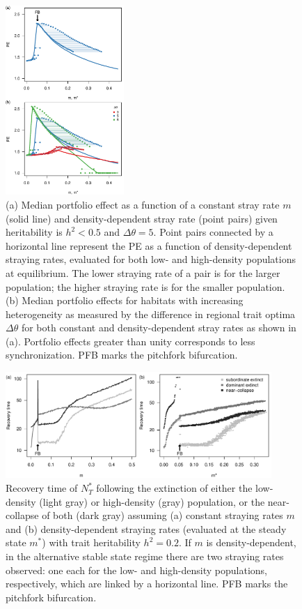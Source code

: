 \documentclass{revtex4}
\begin{document}
\begin{figure}
  \captionsetup{justification=raggedright,
singlelinecheck=false
}
\centering
\includegraphics[width=0.4\textwidth]{fig_thetaPEmvm.pdf}
\caption{
(a) Median portfolio effect as a function of a constant stray rate $m$ (solid line) and density-dependent stray rate (point pairs) given heritability is $h^2 < 0.5$ and $\Delta\theta=5$.
Point pairs connected by a horizontal line represent the PE as a function of density-dependent straying rates, evaluated for both low- and high-density populations at equilibrium. The lower straying rate of a pair is for the larger population; the higher straying rate is for the smaller population.
(b) Median portfolio effects for habitats with increasing heterogeneity as measured by the difference in regional trait optima $\Delta \theta$ for both constant and density-dependent stray rates as shown in (a).
Portfolio effects greater than unity corresponds to less synchronization.
PFB marks the pitchfork bifurcation.
} \label{fig:thetaPE}
\end{figure}

\begin{figure}
  \captionsetup{justification=raggedright,
singlelinecheck=false
}
\centering
\includegraphics[width=0.9\textwidth]{fig_relax_lowh.pdf}
\caption{
Recovery time of $N_T^*$ following the extinction of either the low-density (light gray) or high-density (gray) population, or the near-collapse of both (dark gray) assuming (a) constant straying rates $m$ and (b) density-dependent straying rates (evaluated at the steady state $m^*$) with trait heritability $h^2=0.2$.
If $m$ is density-dependent, in the alternative stable state regime there are two straying rates observed: one each for the low- and high-density populations, respectively, which are linked by a horizontal line.
PFB marks the pitchfork bifurcation.
} \label{fig:relax}
\end{figure}
\end{document}
